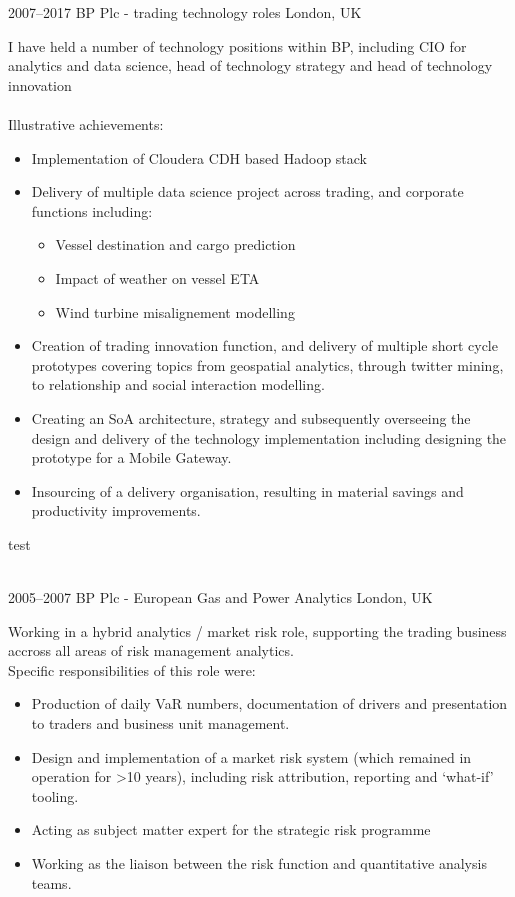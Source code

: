 \documentclass[]{friggeri-cv-a4}
\begin{document}
\begin{entrylist}


\entry
{2007--2017}
{BP Plc - trading technology roles}
{London, UK}
{
I have held a number of technology positions within BP, including CIO for analytics and data science, head of technology strategy and head of technology innovation \\ \\
Illustrative achievements:
\begin{itemize}
	\item Implementation of Cloudera CDH based Hadoop stack	
	\item Delivery of multiple data science project across trading, and corporate functions including:
	\begin{itemize}
		\item Vessel destination and cargo prediction
		\item Impact of weather on vessel ETA
		\item Wind turbine misalignement modelling
	\end{itemize}
	\item Creation of trading innovation function, and delivery of multiple short cycle prototypes covering topics from geospatial analytics, through twitter mining, to relationship and social interaction modelling.
	\item Creating an SoA architecture, strategy and subsequently overseeing the design and delivery of the technology implementation including designing the prototype for a Mobile Gateway.
	\item Insourcing of a delivery organisation, resulting in material savings and productivity improvements.
\end{itemize}
}

\entry
{test}

\\

\entry
{2005--2007}
{BP Plc - European Gas and Power Analytics}
{London, UK}
{
Working in a hybrid analytics / market risk role, supporting the trading business accross all areas of risk management analytics.  \\

Specific responsibilities of this role were:
\begin{itemize}
	\item Production of daily VaR numbers, documentation of drivers and presentation to traders and business unit management.
	\item Design and implementation of a market risk system (which remained in operation for >10 years), including risk attribution, reporting and ‘what-if’ tooling.
	\item Acting as subject matter expert for the strategic risk programme
	\item Working as the liaison between the risk function and quantitative analysis teams.
\end{itemize}
}


\end{entrylist}
\end{document}
